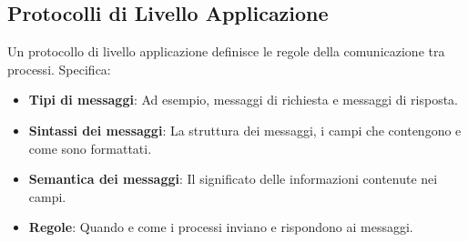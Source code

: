 \subsection{Protocolli di Livello Applicazione}
Un protocollo di livello applicazione definisce le regole della comunicazione tra processi. Specifica:
\begin{itemize}
    \item \textbf{Tipi di messaggi}: Ad esempio, messaggi di richiesta e messaggi di risposta.
    \item \textbf{Sintassi dei messaggi}: La struttura dei messaggi, i campi che contengono e come sono formattati.
    \item \textbf{Semantica dei messaggi}: Il significato delle informazioni contenute nei campi.
    \item \textbf{Regole}: Quando e come i processi inviano e rispondono ai messaggi.
\end{itemize}


